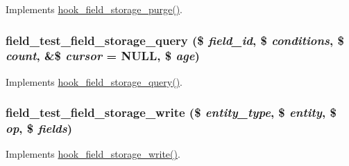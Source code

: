 \label{field__test_8storage_8inc_a5faac556f945fdb5366f0a6034aa5360}
Implements \hyperlink{group__field__crud_gab26211d5d58698d2446bfd855f6137c9}{hook\_\-field\_\-storage\_\-purge()}. \hypertarget{field__test_8storage_8inc_af02cd305f81f7d4059a81aab41d13b4c}{
\subsubsection[{field\_\-test\_\-field\_\-storage\_\-query}]{\setlength{\rightskip}{0pt plus 5cm}field\_\-test\_\-field\_\-storage\_\-query (\$ {\em field\_\-id}, \/  \$ {\em conditions}, \/  \$ {\em count}, \/  \&\$ {\em cursor} = {\ttfamily NULL}, \/  \$ {\em age})}}
\label{field__test_8storage_8inc_af02cd305f81f7d4059a81aab41d13b4c}
Implements \hyperlink{group__field__storage_gaf46795ee1b678a72b4457b524303c794}{hook\_\-field\_\-storage\_\-query()}. \hypertarget{field__test_8storage_8inc_aa7f37b08fb61d3dc31226c409cb9a1ac}{
\subsubsection[{field\_\-test\_\-field\_\-storage\_\-write}]{\setlength{\rightskip}{0pt plus 5cm}field\_\-test\_\-field\_\-storage\_\-write (\$ {\em entity\_\-type}, \/  \$ {\em entity}, \/  \$ {\em op}, \/  \$ {\em fields})}}
\label{field__test_8storage_8inc_aa7f37b08fb61d3dc31226c409cb9a1ac}
Implements \hyperlink{group__field__storage_ga5663ebcfb92828cbed84a041e9a4b0d1}{hook\_\-field\_\-storage\_\-write()}. 